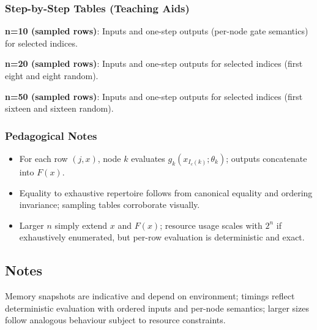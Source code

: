 \subsubsection{Step-by-Step Tables (Teaching Aids)}
\textbf{n=10 (sampled rows)}: Inputs and one-step outputs (per-node gate semantics) for selected indices.

\textbf{n=20 (sampled rows)}: Inputs and one-step outputs for selected indices (first eight and eight random).

\textbf{n=50 (sampled rows)}: Inputs and one-step outputs for selected indices (first sixteen and sixteen random).

\subsubsection{Pedagogical Notes}
\begin{itemize}
 \item For each row $(j,x)$, node $k$ evaluates $g_k(x_{I_c(k)};\theta_k)$; outputs concatenate into $F(x)$.
 \item Equality to exhaustive repertoire follows from canonical equality and ordering invariance; sampling tables corroborate visually.
 \item Larger $n$ simply extend $x$ and $F(x)$; resource usage scales with $2^n$ if exhaustively enumerated, but per-row evaluation is deterministic and exact.
\end{itemize}

\subsection{Notes}
Memory snapshots are indicative and depend on environment; timings reflect deterministic evaluation with ordered inputs and per-node semantics; larger sizes follow analogous behaviour subject to resource constraints.


